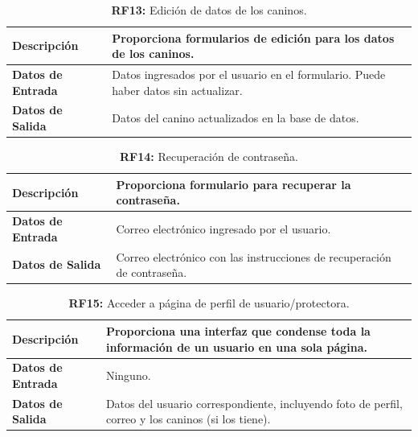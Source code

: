 \documentclass[a4paper, 12pt]{article}
\begin{document}
\begin{table}[H]
\captionsetup{list=no}%
\captionsetup{justification=raggedright,singlelinecheck=false}
\captionsetup{labelformat=empty}
\caption*{\textbf{RF13:} Edición de datos de los caninos.}
\label{tab:RF13}
	\begin{tabular}{|m{5cm}|m{10cm}|}
	\hline
	\textbf{Descripción} & Proporciona formularios de edición para los datos de los caninos. \\ 
	\hline
	\textbf{Datos de Entrada} &  Datos ingresados por el usuario en el formulario. Puede haber datos sin actualizar.  \\ 
	\hline
	\textbf{Datos de Salida} &   Datos del canino actualizados en la base de datos. \\ 
	\hline
\end{tabular}
\end{table}

\begin{table}[H]
\captionsetup{list=no}%
\captionsetup{justification=raggedright,singlelinecheck=false}
\captionsetup{labelformat=empty}
\caption*{\textbf{RF14:} Recuperación de contraseña.}
\label{tab:RF14}
	\begin{tabular}{|m{5cm}|m{10cm}|}
	\hline
	\textbf{Descripción} & Proporciona formulario para recuperar la contraseña. \\ 
	\hline
	\textbf{Datos de Entrada} & Correo electrónico ingresado por el usuario. \\ 
	\hline
	\textbf{Datos de Salida} & Correo electrónico con las instrucciones de recuperación de contraseña. \\ 
	\hline
\end{tabular}
\end{table}

\begin{table}[H]
\captionsetup{list=no}%
\captionsetup{justification=raggedright,singlelinecheck=false}
\captionsetup{labelformat=empty}
\caption*{\textbf{RF15:} Acceder a página de perfil de usuario/protectora.}
\label{tab:RF15}
	\begin{tabular}{|m{5cm}|m{10cm}|}
	\hline
	\textbf{Descripción} & Proporciona una interfaz que condense toda la información de un usuario en una sola página. \\ 
	\hline
	\textbf{Datos de Entrada} & Ninguno. \\ 
	\hline
	\textbf{Datos de Salida} & Datos del usuario correspondiente, incluyendo foto de perfil, correo y los caninos (si los tiene). \\ 
	\hline
\end{tabular}
\end{table}
\end{document}

